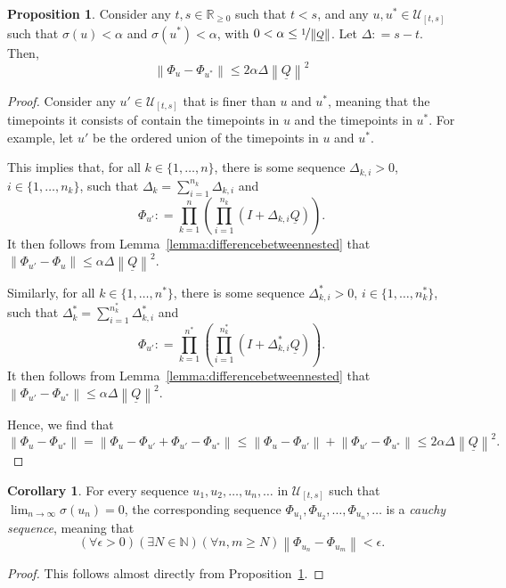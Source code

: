 \documentclass[10pt]{paper}
\theoremstyle{definition}
\newtheorem{proposition}[theorem]{Proposition}
\newtheorem{corollary}[theorem]{Corollary}
\newcommand{\nats}{\mathbb{N}}
\newcommand{\reals}{\mathbb{R}}
\newcommand{\realsnonneg}{\reals_{\geq 0}}
\newcommand{\lrate}{\underline{Q}}
\newcommand{\norm}[1]{\left\lVert #1 \right\rVert}
\newcommand{\coloneqq}{:\!=}
\begin{document}
\begin{proposition}\label{prop:differencebetweenu}
Consider any $t,s\in\realsnonneg$ such that $t<s$, and any $u,u^*\in\mathcal{U}_{[t,s]}$ such that $\sigma(u)<\alpha$ and $\sigma(u^*)<\alpha$, with $0<\alpha\leq\nicefrac{1}{\norm{\lrate}}$. Let $\Delta\coloneqq s-t$. Then,
\begin{equation*}
\norm{\Phi_u-\Phi_{u^*}}\leq 2\alpha\Delta\norm{\lrate}^2
\end{equation*}
\end{proposition}
\begin{proof}
Consider any $u'\in\mathcal{U}_{[t,s]}$ that is finer than $u$ and $u^*$, meaning that the timepoints it consists of contain the timepoints in $u$ and the timepoints in $u^*$. For example, let $u'$ be the ordered union of the timepoints in $u$ and $u^*$.

This implies that, for all $k\in\{1,\dots,n\}$, there is some sequence $\Delta_{k,i}>0$, $i\in\{1,\dots,n_k\}$, such that $\Delta_k=\sum_{i=1}^{n_k}\Delta_{k,i}$ and
\begin{equation*}
\Phi_{u'}\coloneqq\prod_{k=1}^n\left(\prod_{i=1}^{n_k}(I+\Delta_{k,i}\lrate)\right).
\end{equation*}
It then follows from Lemma~\ref{lemma:differencebetweennested} that $\norm{\Phi_{u'}-\Phi_u}\leq\alpha\Delta\norm{\lrate}^2$. 

Similarly, for all $k\in\{1,\dots,n^*\}$, there is some sequence $\Delta^*_{k,i}>0$, $i\in\{1,\dots,n^*_k\}$, such that $\Delta^*_k=\sum_{i=1}^{n^*_k}\Delta^*_{k,i}$ and
\begin{equation*}
\Phi_{u'}\coloneqq\prod_{k=1}^{n^*}\left(\prod_{i=1}^{n^*_k}(I+\Delta^*_{k,i}\lrate)\right).
\end{equation*}
It then follows from Lemma~\ref{lemma:differencebetweennested} that $\norm{\Phi_{u'}-\Phi_{u^*}}\leq\alpha\Delta\norm{\lrate}^2$.

Hence, we find that
\begin{equation*}
\norm{\Phi_{u}-\Phi_{u^*}}
=
\norm{\Phi_{u}-\Phi_{u'}+\Phi_{u'}-\Phi_{u^*}}
\leq
\norm{\Phi_{u}-\Phi_{u'}}
+
\norm{\Phi_{u'}-\Phi_{u^*}}
\leq2\alpha\Delta\norm{\lrate}^2.
\end{equation*}
\end{proof}

\begin{corollary}\label{corol:cauchy}
For every sequence $u_1,u_2,\dots,u_n,\dots$ in $\mathcal{U}_{[t,s]}$ such that $\lim_{n\to\infty}\sigma(u_n)=0$, the corresponding sequence $\Phi_{u_1},\Phi_{u_2},\dots,\Phi_{u_n},\dots$ is a \emph{cauchy sequence}, meaning that
\begin{equation*}
(\forall \epsilon>0)(\exists N\in\nats)(\forall n,m\geq N)
\norm{\Phi_{u_n}-\Phi_{u_m}}<\epsilon.
\end{equation*}
\end{corollary}
\begin{proof}
This follows almost directly from Proposition~\ref{prop:differencebetweenu}.
\end{proof}
\end{document}
